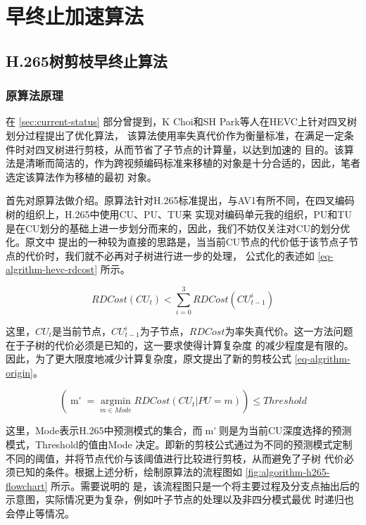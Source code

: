 \chapter{早终止加速算法}
\label{cha:algorithm}

\section{H.265树剪枝早终止算法}

\subsection{原算法原理}

在 \ref{sec:current-status} 部分曾提到，K Choi和SH Park等人在HEVC上针对四叉树划分过程提出了优化算法，
该算法使用率失真代价作为衡量标准，在满足一定条件时对四叉树进行剪枝，从而节省了子节点的计算量，以达到加速的
目的。该算法是清晰而简洁的，作为跨视频编码标准来移植的对象是十分合适的，因此，笔者选定该算法作为移植的最初
对象。


首先对原算法做介绍。原算法针对H.265标准提出，与AV1有所不同，在四叉编码树的组织上，H.265中使用CU、PU、TU来
实现对编码单元我的组织，PU和TU是在CU划分的基础上进一步划分而来的，因此，我们不妨仅关注对CU的划分优化。原文中
提出的一种较为直接的思路是，当当前CU节点的代价低于该节点子节点的代价时，我们就不必再对子树进行进一步的处理，
公式化的表述如 \ref{eq-algrithm-hevc-rdcost} 所示。

\begin{equation}
\label{eq-algrithm-hevc-rdcost}
RDCost(CU_t) < \sum_{i=0}^3 RDCost(CU^i_{t-1})
\end{equation}


这里，$CU_t$是当前节点，$CU^i_{t-1}$为子节点，$RDCost$为率失真代价。这一方法问题在于子树的代价必须是已知的，这一要求使得计算复杂度
的减少程度是有限的。因此，为了更大限度地减少计算复杂度，原文提出了新的剪枝公式 \ref{eq-algrithm-origin}。

\begin{equation}
\label{eq-algrithm-origin}
(\mathop{m'} =  \mathop{argmin}\limits_{m \in Mode} RDCost(CU_t | PU=m)) \le Threshold 
\end{equation}

这里，Mode表示H.265中预测模式的集合，而$\mathop{m'}$则是为当前CU深度选择的预测模式，Threshold的值由Mode
决定。即新的剪枝公式通过为不同的预测模式定制不同的阈值，并将节点代价与该阈值进行比较进行剪枝，从而避免了子树
代价必须已知的条件。根据上述分析，绘制原算法的流程图如 \ref{fig:algorithm-h265-flowchart} 所示。需要说明的
是，该流程图只是一个将主要过程及分支点抽出后的示意图，实际情况更为复杂，例如叶子节点的处理以及非四分模式最优
时递归也会停止等情况。


